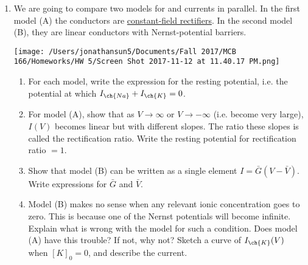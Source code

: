 \documentclass[11pt]{article}
\begin{document}
\begin{enumerate}[label=\arabic*.]
\newpage
\item
We are going to compare two models for  and  currents in parallel. In the first model (A) the conductors are \underline{constant-field rectifiers}. In the second model (B), they are linear conductors with Nernst-potential barriers.
\begin{center}
\texttt{[image: /Users/jonathansun5/Documents/Fall 2017/MCB 166/Homeworks/HW 5/Screen Shot 2017-11-12 at 11.40.17 PM.png]}
\end{center}
\begin{enumerate}[label=(\alph*)]
\item
For each model, write the expression for the resting potential, i.e. the potential at which $I_{\ch{Na}} + I_{\ch{K}} = 0$.








\item
For model (A), show that as $V \rightarrow \infty$ or $V \rightarrow -\infty$ (i.e. become very large), $I(V)$ becomes linear but with different slopes. The ratio these slopes is called the rectification ratio. Write the resting potential for rectification ratio $= 1$.











\item
Show that model (B) can be written as a single element $I = \bar{G}(V - \bar{V})$. Write expressions for $\bar{G}$ and $\bar{V}$.










\item
Model (B) makes no sense when any relevant ionic concentration goes to zero. This is because one of the Nernst potentials will become infinite. Explain what is wrong with the model for such a condition. Does model (A) have this trouble? If not, why not? Sketch a curve of $I_{\ch{K}}(V)$ when $[K]_0 = 0$, and describe the current.






\end{enumerate}
\end{enumerate}
\end{document}
